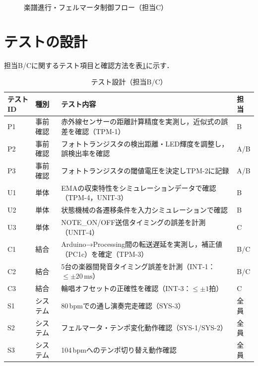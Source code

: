 \begin{figure}[H]
  \centering
  \caption{楽譜進行・フェルマータ制御フロー（担当C）}
  \label{fig:flow-score}
\end{figure}

\section{テストの設計}

担当B/Cに関するテスト項目と確認方法を表\ref{tab:tests}に示す．

\begin{table}[H]
  \centering
  \begin{tabularx}{\linewidth}{llXl}
    \toprule
    テストID & 種別 & テスト内容 & 担当 \\
    \midrule
    P1 & 事前確認 &
      赤外線センサーの距離計算精度を実測し，近似式の誤差を確認（TPM-1） & B \\
    P2 & 事前確認 &
      フォトトランジスタの検出距離・LED輝度を調整し，誤検出率を確認 & A/B \\
    P3 & 事前確認 &
      フォトトランジスタの閾値電圧を決定しTPM-2に記録 & A/B \\
    U1 & 単体 &
      EMAの収束特性をシミュレーションデータで確認（TPM-4，UNIT-3） & B \\
    U2 & 単体 &
      状態機械の各遷移条件を入力シミュレーションで確認 & B \\
    U3 & 単体 &
      NOTE\_ON/OFF送信タイミングの誤差を計測（UNIT-4） & C \\
    C1 & 結合 &
      Arduino→Processing間の転送遅延を実測し，補正値（PC1c）を確定（TPM-3） & B/C \\
    C2 & 結合 &
      5台の楽器間発音タイミング誤差を計測（INT-1：$\leq \pm 20\,\mathrm{ms}$） & B/C \\
    C3 & 結合 &
      輪唱オフセットの正確性を確認（INT-3：$\leq \pm 1$拍） & C \\
    S1 & システム &
      80\,bpmでの通し演奏完走確認（SYS-3） & 全員 \\
    S2 & システム &
      フェルマータ・テンポ変化動作確認（SYS-1/SYS-2） & 全員 \\
    S3 & システム &
      104\,bpmへのテンポ切り替え動作確認 & 全員 \\
    \bottomrule
  \end{tabularx}
  \caption{テスト設計（担当B/C）}
  \label{tab:tests}
\end{table}
